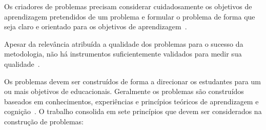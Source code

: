 Os criadores de problemas precisam considerar cuidadosamente
os objetivos de aprendizagem pretendidos de um problema
e formular o problema de forma que seja claro e
orientado para os objetivos
de aprendizagem~\cite{sockalingam2011student}.

Apesar da relevância atribuída a qualidade dos problemas para o
sucesso da metodologia, não há instrumentos suficientemente
validados para medir sua
qualidade~\cite{des1999delphi,sockalingam2012assessing}.

Os problemas devem ser construídos de forma a
direcionar os estudantes
para um ou mais objetivos de educacionais.
Geralmente os problemas são construídos baseados em conhecimentos,
experiências e princípios teóricos de aprendizagem e
cognição~\cite{des1999delphi,dolmans1997seven}.
O trabalho \cite{dolmans1997seven} consolida em sete
princípios que devem ser considerados na construção
de problemas:

